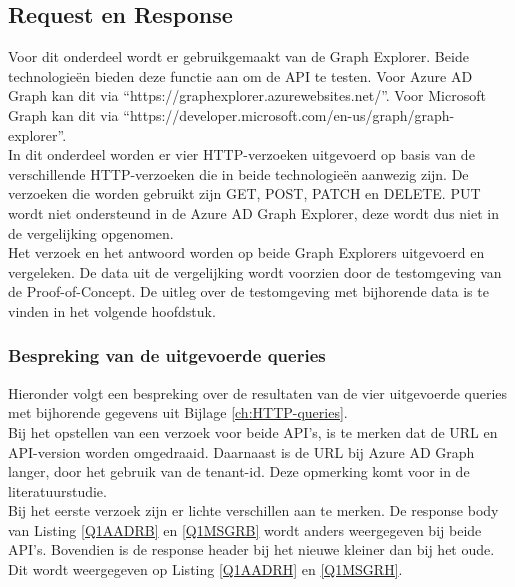 \subsection{Request en Response}


Voor dit onderdeel wordt er gebruikgemaakt van de Graph Explorer. Beide technologieën bieden deze functie aan om de \ac{API} te testen. Voor Azure \ac{AD} Graph kan dit via “https://graphexplorer.azurewebsites.net/”. Voor Microsoft Graph kan dit via “https://developer.microsoft.com/en-us/graph/graph-explorer”. \\

In dit onderdeel worden er vier \ac{HTTP}-verzoeken uitgevoerd op basis van de verschillende \ac{HTTP}-verzoeken die in beide technologieën aanwezig zijn. De verzoeken die worden gebruikt zijn GET, POST, PATCH en DELETE. PUT wordt niet ondersteund in de Azure \ac{AD} Graph Explorer, deze wordt dus niet in de vergelijking opgenomen. \\

Het verzoek en het antwoord worden op beide Graph Explorers uitgevoerd en vergeleken. De data uit de vergelijking wordt voorzien door de testomgeving van de Proof-of-Concept. De uitleg over de testomgeving met bijhorende data is te vinden in het volgende hoofdstuk. 

\subsubsection{Bespreking van de uitgevoerde queries}


Hieronder volgt een bespreking over de resultaten van de vier uitgevoerde queries met bijhorende gegevens uit Bijlage \ref{ch:HTTP-queries}. \\ 

Bij het opstellen van een verzoek voor beide \Ac{API}'s, is te merken dat de \Ac{URL} en \Ac{API}-version worden omgedraaid. Daarnaast is de \Ac{URL} bij Azure \ac{AD} Graph langer, door het gebruik van de tenant-id. Deze opmerking komt voor in de literatuurstudie. \\

Bij het eerste verzoek zijn er lichte verschillen aan te merken. De response body van Listing \ref{Q1AADRB} en \ref{Q1MSGRB} wordt anders weergegeven bij beide \ac{API}'s. Bovendien is de response header bij het nieuwe kleiner dan bij het oude. Dit wordt weergegeven op Listing \ref{Q1AADRH} en \ref{Q1MSGRH}. \\

